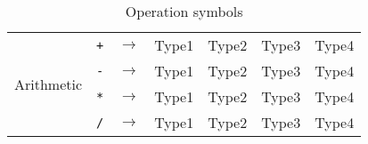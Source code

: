\begin{table}[h!]
\begin{tabular}{ |c|c|c||c|c|c|c| }
        \multirow{4}{*}{Arithmetic} 
        & \texttt{+}
        & $\rightarrow$ 
        & Type1 
        & Type2 
        & Type3 
        & Type4 
        \\
        
         
        & \texttt{-}
        & $\rightarrow$ 
        & Type1 
        & Type2 
        & Type3 
        & Type4 
        \\
         
        & \texttt{*} 
        & $\rightarrow$ 
        & Type1 
        & Type2 
        & Type3 
        & Type4 
        \\
         
        & \texttt{/}
        & $\rightarrow$ 
        & Type1 
        & Type2 
        & Type3 
        & Type4 
        \\\hline
    \end{tabular}
    \caption{Operation symbols}
    \label{table:operatorsymbols}
\end{table}

